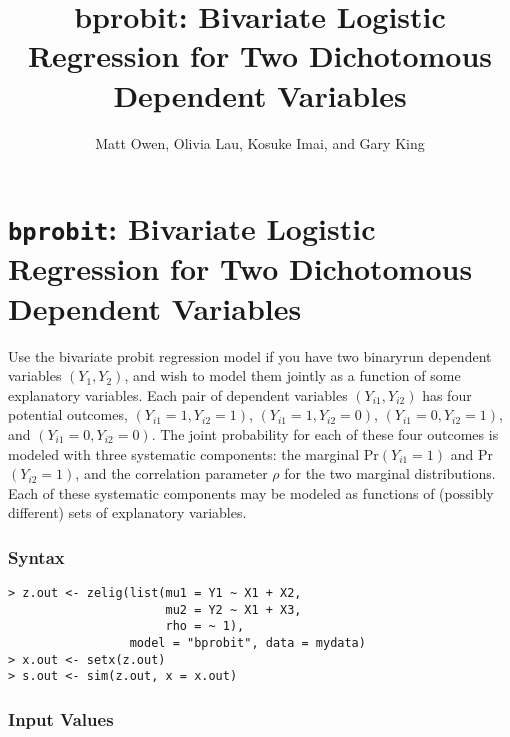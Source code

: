 \documentclass{article}
\title{
  bprobit: Bivariate Logistic Regression for Two
  Dichotomous Dependent Variables
}
\author{Matt Owen, Olivia Lau, Kosuke Imai, and Gary King}
\begin{document}
\nobibliography*



\section{{\tt bprobit}: Bivariate Logistic Regression for Two
Dichotomous Dependent Variables}\label{bprobit}

Use the bivariate probit regression model if you have two binaryrun
dependent variables $(Y_1, Y_2)$, and wish to model them jointly as a
function of some explanatory variables.  Each pair of dependent
variables $(Y_{i1}, Y_{i2})$ has four potential outcomes, $(Y_{i1}=1,
Y_{i2}=1)$, $(Y_{i1}=1, Y_{i2}=0)$, $(Y_{i1}=0, Y_{i2}=1)$, and
$(Y_{i1}=0, Y_{i2}=0)$.  The joint probability for each of these four
outcomes is modeled with three systematic components: the marginal
Pr$(Y_{i1} = 1)$ and Pr$(Y_{i2} = 1)$, and the correlation parameter
$\rho$ for the two marginal distributions.  Each of these systematic
components may be modeled as functions of (possibly different) sets of
explanatory variables.

\subsubsection{Syntax}

\begin{verbatim}
> z.out <- zelig(list(mu1 = Y1 ~ X1 + X2, 
                      mu2 = Y2 ~ X1 + X3,
                      rho = ~ 1),
                 model = "bprobit", data = mydata)
> x.out <- setx(z.out)
> s.out <- sim(z.out, x = x.out)
\end{verbatim}

\subsubsection{Input Values}
\end{document}
